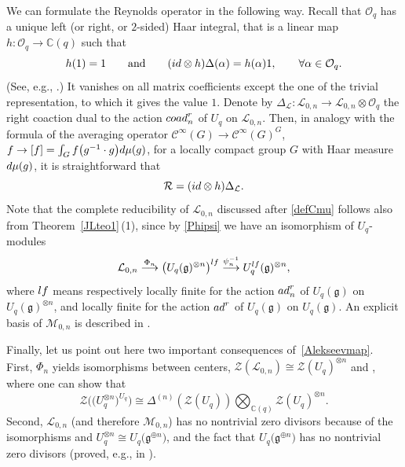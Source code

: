 \documentclass[11pt]{article}
\numberwithin{equation}{section}
\numberwithin{equation}{section}
\theoremstyle{definition}
\newcommand{\mc}{\mathbb{C}}
\newcommand{\Ll}{{\mathcal L}}
\newcommand{\Mm}{{\mathcal M}}
\newcommand{\Oo}{{\mathcal O}}
\newcommand{\Rr}{{\mathcal R}}
\newcommand{\ra}{\rightarrow}
\begin{document}
We can formulate the Reynolds operator in the following way. Recall that $\Oo_q$ has a unique left (or right, or $2$-sided) Haar integral, that is a linear map $h\colon \Oo_q\ra \mc(q)$ such that
\[%
h(1)=1 \qquad \text{and}\qquad ({\rm id}\otimes h)\Delta(\alpha) = h(\alpha)1,\qquad \forall \alpha\in \Oo_q.
\]
(See, e.g., \cite[Proposition 13.3.6]{CP}.) It vanishes on all matrix coefficients except the one of the trivial representation, to which it gives the value $1$. Denote by $\Delta_\Ll\colon {\mathcal L}_{0,n} \ra {\mathcal L}_{0,n}\otimes \Oo_q$ the right coaction dual to the action ${\rm coad}_n^r$ of $U_q$ on ${\mathcal L}_{0,n}$. Then, in analogy with the formula of the averaging operator $\mathcal{C}^\infty(G) \ra \mathcal{C}^\infty(G)^G$, $f\ra [f] = \int_G f\big(g^{-1} \cdot g\big) {\rm d}\mu(g)$, for a locally compact group $G$ with Haar measure ${\rm d}\mu(g)$, it is straightforward that
\begin{equation}\label{formuleRh}
\Rr = ({\rm id}\otimes h)\Delta_\Ll .
\end{equation}
Note that the complete reducibility of $\Ll_{0,n}$ discussed after \eqref{defCmu} follows also from Theorem~\ref{JLteo1}\,(1), since by \eqref{Phipsi} we have an isomorphism of $U_q$-modules
\[%
{\mathcal L}_{0,n} \stackrel{\Phi_n}{\longrightarrow} \big(U_q({\mathfrak g})^{\otimes n}\big)^{\rm lf} \stackrel{\psi_n^{-1}}{\longrightarrow}U_q^{\rm lf}({\mathfrak g})^{\otimes n},
\]
where ${\rm lf}$ means respectively locally finite for the action ${\rm ad}_n^r$ of $U_q({\mathfrak g})$ on $U_q({\mathfrak g})^{\otimes n}$, and locally finite for the action ${\rm ad}^r$ of $U_q({\mathfrak g})$ on $U_q({\mathfrak g})$. An explicit basis of $\Mm_{0,n}$ is described in \cite[Pro\-po\-sition~6.22]{BR}.

Finally, let us point out here two important consequences of~\eqref{Alekseevmap}. First, $\Phi_n$ yields isomorphisms between centers, $\mathcal{Z}(\Ll_{0,n}) \cong \mathcal{Z}(U_q)^{\otimes n}$ and \smash{$\mathcal{Z}\big(\Ll_{0,n}^{U_q}\big) \cong \mathcal{Z}\big(\big(U_{q}^{\otimes n}\big)^{U_q}\big)$}, where one can show that \cite[Lemma 6.29]{BR}
\begin{equation}\label{Zinv}
\mathcal{Z}\big(\big(U_{q}^{\otimes n}\big)^{U_q}\big)\cong \Delta^{(n)}(\mathcal{Z}(U_q))\bigotimes_{{\mathbb C}(q)}\mathcal{Z}(U_q)^{\otimes n}.
\end{equation}
Second, $\Ll_{0,n}$ (and therefore $\Mm_{0,n}$) has no nontrivial zero divisors because of the isomorphisms \smash{$\Phi_n\colon \Ll_{0,n} \ra \big(U_q^{\otimes n}\big)^{\rm lf}\subset U_q^{\otimes n}$} and $U_q^{\otimes n}\cong U_q\big(\mathfrak{g}^{\oplus n}\big)$, and the fact that $U_q\big(\mathfrak{g}^{\oplus n}\big)$ has no nontrivial zero divisors (proved, e.g., in \cite{DC-K}).
\end{document}
